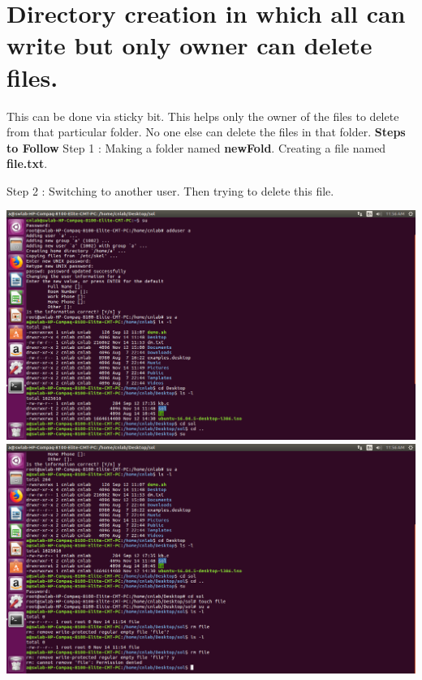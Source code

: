 \documentclass{article}
\begin{document}
\section{Directory creation in which all can write but only owner can delete files.}

This can be done via sticky bit. This helps only the owner of the files to delete from that particular folder. No one else can delete the files in that folder.
\newline\newline
\textbf{Steps to Follow}
\newline\newline
Step 1 : Making a folder named \textbf{newFold}. Creating a file named \textbf{file.txt}.\newline

Step 2 : Switching to another user. Then trying to delete this file.\newline
\begin{center}
    \includegraphics[scale=0.2]{sticky2.png}
    \includegraphics[scale=0.2]{sticky3.png}
\end{center}
\newpage
\end{document}
